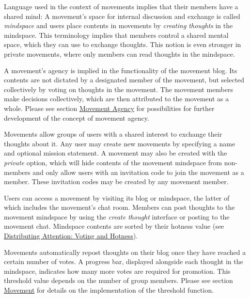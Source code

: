 Language used in the context of movements implies that their members
have a shared mind: A movement's space for internal discussion and
exchange is called \emph{mindspace} and users place contents in
movements by \emph{creating thoughts} in the mindspace. This terminology
implies that members control a shared mental space, which they can use
to exchange thoughts. This notion is even stronger in private movements,
where only members can read thoughts in the mindspace.

A movement's agency is implied in the functionality of the movement
blog. Its contents are not dictated by a designated member of the
movement, but selected collectively by voting on thoughts in the
movement. The movement members make decisions collectively, which are
then attributed to the movement as a whole. Please see section
\hyperref[movement-agency]{Movement Agency} for possibilities for
further development of the concept of movement agency.


Movements allow groups of users with a shared interest to exchange their
thoughts about it. Any user may create new movements by specifying a
name and optional mission statement. A movement may also be created with
the \emph{private} option, which will hide contents of the movement
mindspace from non-members and only allow users with an invitation code
to join the movement as a member. These invitation codes may be created
by any movement member.

Users can access a movement by visiting its blog or mindspace, the
latter of which includes the movement's chat room. Members can post
thoughts to the movement mindspace by using the \emph{create thought}
interface or posting to the movement chat. Mindspace contents are sorted
by their hotness value (see \hyperref[hotness]{Distributing Attention:
Voting and Hotness}).


Movements automatically repost thoughts on their blog once they have
reached a certain number of votes. A progress bar, displayed alongside
each thought in the mindspace, indicates how many more votes are
required for promotion. This threshold value depends on the number of
group members. Please see section \hyperref[movement]{Movement} for
details on the implementation of the threshold function.

